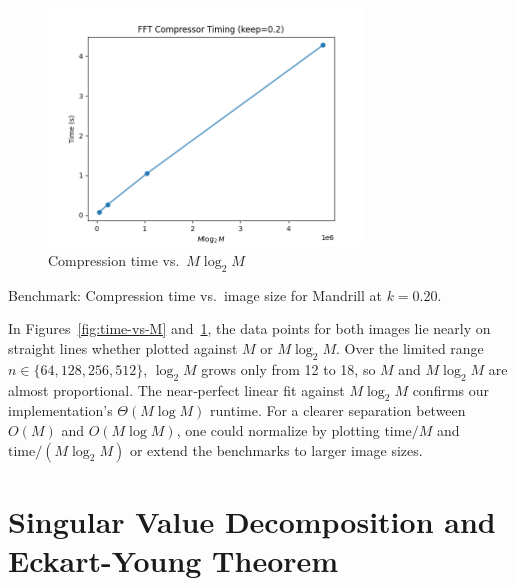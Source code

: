 \documentclass[12pt]{article}
\begin{document}
\begin{figure}[H]
  \centering
  \includegraphics[width=0.75\textwidth]{time_vs_MlogM_Mandrill.png}
  \caption{Compression time vs.\ $M\log_2M$}
  \label{fig:time-vs-MlogM}
\end{figure}

\begin{table}[H]
  \centering
  \caption{Benchmark: Compression time vs.\ image size for Mandrill at \(k=0.20\).}
\end{table}

\noindent In Figures~\ref{fig:time-vs-M} and~\ref{fig:time-vs-MlogM}, the data points for both images lie nearly on straight lines whether plotted against \(M\) or \(M\log_2M\).  
Over the limited range \(n\in\{64,128,256,512\}\), \(\log_2M\) grows only from 12 to 18, so \(M\) and \(M\log_2M\) are almost proportional.  
The near‐perfect linear fit against \(M\log_2M\) confirms our implementation’s \(\Theta(M\log M)\) runtime.  
For a clearer separation between \(O(M)\) and \(O(M\log M)\), one could normalize by plotting \(\mathrm{time}/M\) and \(\mathrm{time}/(M\log_2M)\) or extend the benchmarks to larger image sizes.



\section{Singular Value Decomposition and Eckart-Young Theorem}
\end{document}

